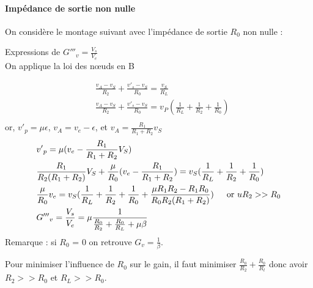 \documentclass[../../Cours_M1.tex]{subfiles}
\begin{document}
\paragraph{Impédance de sortie non nulle}
On considère le montage suivant avec l'impédance de sortie $R_0$ non nulle :\\
\medbreak
\begin{center}
\end{center}
\medbreak
Expressions de ${G'''}_v = \frac{V_s}{V_e}$\\
On applique la loi des nœuds en B

\begin{align*}
& \frac{v_A-v_S}{R_2}+\frac{{v'}_s-v_S}{R_0} = \frac{v_S}{R_L}\\
& \frac{v_A-v_S}{R_2}+\frac{{v'}_s-v_S}{R_0} = v_P(\frac{1}{R_L}+\frac{1}{R_2}+\frac{1}{R_0})\\
\end{align*}
or, ${v'}_p=\mu\epsilon$, $v_A=v_e-\epsilon$, et $v_A=\frac{R_1}{R_1+R_2}v_S$\\

\begin{align*}
& {v'}_p=\mu(v_e-\frac{R_1}{R_1+R_2}V_S)\\
& \frac{R_1}{R_2(R_1+R_2)}V_S +\frac{\mu}{R_0}(v_e-\frac{R_1}{R_1+R_2})=v_S(\frac{1}{R_L}+\frac{1}{R_2}+\frac{1}{R_0})\\
& \frac{\mu}{R_0}v_e = v_S(\frac{1}{R_L}+\frac{1}{R_2}+\frac{1}{R_0} + \frac{\mu R_1R_2-R_1R_0}{R_0R_2(R_1+R_2)}) \text{\indent or }uR_2>>R_0\\
& {G'''}_v = \frac{V_s}{V_e} = \mu \frac{1}{\frac{R_0}{R_2}+\frac{R_0}{R_L}+\mu\beta}
\end{align*}
Remarque : si $R_0$ = 0 on retrouve $G_v=\frac{1}{\beta}$.

Pour minimiser l'influence de $R_0$ sur le gain, il faut minimiser $\frac{R_0}{R_2}+\frac{R_0}{R_l}$ donc avoir $R_2 >> R_0$ et $R_L >> R_0$.
\end{document}
